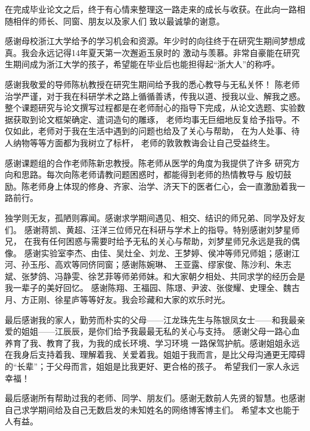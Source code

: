 \cleardoublepage
{}

在完成毕业论文之后，终于有心情来整理这一路走来的成长与收获。在此向一路相随相伴的师长、同窗、朋友以及家人们
致以最诚挚的谢意。

感谢母校浙江大学给予的学习机会和资源。年少时的向往终于在研究生期间梦想成真。我会永远记得14年夏天第一次邂逅玉泉时的
激动与羡慕。非常自豪能在研究生期间成为浙江大学的孩子，希望能在毕业后也能担得起“浙大人”的称呼。

感谢我敬爱的导师陈杭教授在研究生期间给予我的悉心教导与无私关怀！
陈老师治学严谨，对于我在科研学术之路上循循善诱，传我以道、授我以业、解我之惑。
整个课题研究与论文撰写过程都是在老师耐心的指导下完成，从论文选题、实验数据获取到论文框架确定、遣词造句的雕琢，
老师均事无巨细地反复给予指导。不仅如此，老师对于我在生活中遇到的问题也给及了关心与帮助，
在为人处事、待人纳物等等方面都为我树立了标杆，
老师的敦敦教诲会让自己受益终生。


感谢课题组的合作老师陈新忠教授。陈老师从医学的角度为我提供了许多
研究方向和思路。每次向陈老师请教问题困惑时，都能得到老师的热情教导与
殷切鼓励。陈老师身上体现的修身、齐家、治学、济天下的医者仁心，会一直激励着我一路前行。

独学则无友，孤陋则寡闻。感谢求学期间遇见、相交、结识的师兄弟、同学及好友们。
感谢蒋凯、黄超、汪洋三位师兄在科研与学术上的指导。特别感谢刘梦星师兄，
在我有任何困惑与需要时给予无私的关心与帮助，刘梦星师兄永远是我的偶像。
感谢实验室李杰、由佳、吴灶全、刘龙、王梦婷、侯冲等师兄师姐；感谢江河、孙玉彤、高欢等同侪同窗；感谢陈婉琳、
王亚露、缪家俊、陈沙利、朱志斌、张梦鸽、冯静雯、徐艺菲等师弟师妹。和大家朝夕相处、共同求学的经历会是我一辈子的美好回忆。
感谢陈翔、王福园、陈璟、尹波、张俊耀、史理全、魏古月、方正刚、徐星庐等等好友。我会珍藏和大家的欢乐时光。


最后感谢我的家人，勤劳而朴实的父母——江龙珠先生与陈银凤女士——和我最亲爱的姐姐——江辰辰，是你们给予我最最无私的关心与支持。
感谢父母一路心血养育了我、教育了我，为我的成长环境、学习环境
一路保驾护航。感谢姐姐永远在我身后支持着我、理解着我、关爱着我。姐姐于我而言，是比父母沟通更无障碍的“长辈”；于父母而言，姐姐是比我更好、更合格的孩子。
希望我们一家人永远幸福！

最后感谢所有帮助过我的老师、同学、朋友们。感谢无数前人先贤的智慧。也感谢自己求学期间给及自己无数启发的未知姓名的网络博客博主们。
希望本文也能于人有益。


